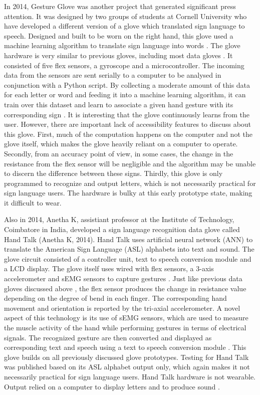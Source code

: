 In 2014, Gesture Glove \parencite{CornellGlove} was another project that generated significant press attention. It was designed by two groups of students at Cornell University who have developed a different version of a glove which translated sign language to speech. Designed and built to be worn on the right hand, this glove used a machine learning algorithm to translate sign language into words \parencite{CornellGlove}. The glove hardware is very similar to previous gloves, including most data gloves \parencite{Premaratne2013a}. It consisted of five flex sensors, a gyroscope and a microcontroller. The incoming data from the sensors are sent serially to a computer to be analysed in conjunction with a Python script. By collecting a moderate amount of this data for each letter or word and feeding it into a machine learning algorithm, it can train over this dataset and learn to associate a given hand gesture with its corresponding sign  \parencite{CornellGlove}. It is interesting that the glove continuously learns from the user. However, there are important lack of accessibility features to discuss about this glove. First, much of the computation happens on the computer and not the glove itself, which makes the glove heavily reliant on a computer to operate. Secondly, from an accuracy point of view, in some cases, the change in the resistance from the flex sensor will be negligible and the algorithm may be unable to discern the difference between these signs. Thirdly, this glove is only programmed to recognize and output letters, which is not necessarily practical for sign language users. The hardware is bulky at this early prototype state, making it difficult to wear. 


Also in 2014, Anetha K, assistiant professor at the Institute of Technology, Coimbatore in India, developed a sign language recognition data glove called Hand Talk (Anetha K, 2014). Hand Talk uses artificial neural network (ANN) to translate the American Sign Language (ASL) alphabets into text and sound. The glove circuit consisted of a controller unit, text to speech conversion module and a LCD display. The glove itself uses wired with flex sensors, a 3-axis accelerometer and sEMG sensors to capture gestures \parencite{AnethaK2014}. Just like previous data gloves discussed above  \parencite{AcceleGlove2016}  \parencite{EnableTalk}  \parencite{Rozak}  \parencite{CornellGlove}, the flex sensor produces the change in resistance value depending on the degree of bend in each finger. The corresponding hand movement and orientation is reported by the tri-axial accelerometer. A novel aspect of this technology is its use of sEMG sensors, which are used to measure the muscle activity of the hand while performing gestures in terms of electrical signals. The recognized gesture are then converted and displayed as corresponding text and speech using a text to speech conversion module \parencite{AnethaK2014}. This glove builds on all previously discussed glove prototypes. Testing for Hand Talk was published based on its ASL alphabet output only, which again makes it not necessarily practical for sign language users. Hand Talk hardware is not wearable. Output relied on a computer to display letters and to produce sound \parencite{AnethaK2014}. 


